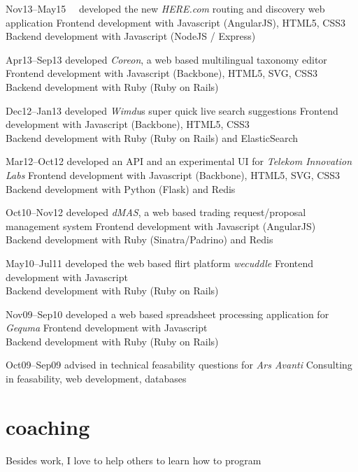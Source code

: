 \documentclass[]{friggeri-cv}
\begin{document}
\begin{entrylist}
  \entry
    {Nov13–May15~~}
    {developed the new \emph{HERE.com} routing and discovery web application}
    {}
    {Frontend development with Javascript (AngularJS), HTML5, CSS3\\
     Backend development with Javascript (NodeJS / Express)}

  \entry
    {Apr13–Sep13}
    {developed \emph{Coreon}, a web based multilingual taxonomy editor}
    {}
    {Frontend development with Javascript (Backbone), HTML5, SVG, CSS3\\
     Backend development with Ruby (Ruby on Rails)}

  \entry
    {Dec12–Jan13}
    {developed \emph{Wimdu}s super quick live search suggestions}
    {}
    {Frontend development with Javascript (Backbone), HTML5, CSS3\\
     Backend development with Ruby (Ruby on Rails) and ElasticSearch}

  \entry
    {Mar12–Oct12}
    {developed an API and an experimental UI for \emph{Telekom Innovation Labs}}
    {}
    {Frontend development with Javascript (Backbone), HTML5, SVG, CSS3\\
     Backend development with Python (Flask) and Redis}

  \entry
    {Oct10–Nov12}
    {developed \emph{dMAS}, a web based trading request/proposal management system}
    {}
    {Frontend development with Javascript (AngularJS)\\
     Backend development with Ruby (Sinatra/Padrino) and Redis}

  \entry
    {May10–Jul11}
    {developed the web based flirt platform \emph{wecuddle}}
    {}
    {Frontend development with Javascript\\
     Backend development with Ruby (Ruby on Rails)}

  \entry
    {Nov09–Sep10}
    {developed a web based spreadsheet processing application for \emph{Gequma}}
    {}
    {Frontend development with Javascript\\
     Backend development with Ruby (Ruby on Rails)}

  \entry
    {Oct09–Sep09}
    {advised in technical feasability questions for \emph{Ars Avanti}}
    {}
    {Consulting in feasability, web development, databases}


\end{entrylist}


\section{coaching}
Besides work, I love to help others to learn how to program
\end{document}
